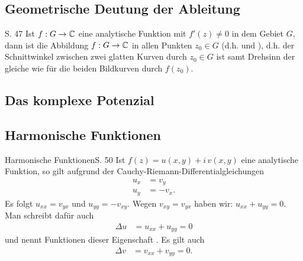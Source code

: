 \pagebreak
\subsection{Geometrische Deutung der Ableitung}

\begin{satz}{S. 47}
  Ist $f : G \to \mathbb{C}$ eine analytische Funktion mit $f'(z) \neq 0$ in dem Gebiet $G$, dann ist die Abbildung $f : G \to \mathbb{C}$ in allen Punkten $z_0 \in G$  (d.h.  und ), d.h. der Schnittwinkel zwischen zwei glatten Kurven durch $z_0 \in G$ ist samt Drehsinn der gleiche wie für die beiden Bildkurven durch $f(z_0)$.
\end{satz}



\subsection{Das komplexe Potenzial}





\subsection{Harmonische Funktionen}

\begin{bemerkung}{Harmonische Funktionen}{S. 50}
  Ist $f(z) = u(x,y) + i \, v(x,y)$ eine analytische Funktion, so gilt aufgrund der Cauchy-Riemann-Differentialgleichungen
  \begin{align}
    u_x &= v_y\\
    u_y &= - v_x .
  \end{align}
  Es folgt $u_{xx} = v_{yx}$ und $u_{yy} = -v_{xy}$.
  Wegen $v_{xy} = v_{yx}$ haben wir: $u_{xx} + u_{yy} = 0$.
  Man schreibt dafür auch
  \begin{align}
    \Delta u &= u_{xx} + u_{yy} = 0
  \end{align}
  und nennt Funktionen dieser Eigenschaft .
  Es gilt auch
  \begin{align}
    \Delta v &= v_{xx} + v_{yy} = 0 .
  \end{align}
\end{bemerkung}

